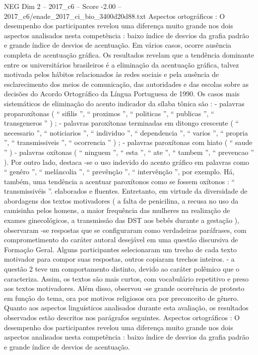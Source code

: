 \begin{textsample}{NEG Dim 2 – 2017\_c6 – Score -2.00 – 2017\_c6/enade\_2017\_ci\_bio\_3400d20d88.txt}
Aspectos ortográficos : O desempenho dos participantes revelou uma diferença muito grande nos dois aspectos analisados nesta competência : baixo índice de desvios da grafia padrão e grande índice de desvios de acentuação.
Em vários casos, ocorre ausência completa de acentuação gráfica.
Os resultados revelam que a tendência dominante entre os universitários brasileiros é a eliminação da acentuação gráfica, talvez motivada pelos hábitos relacionados às redes sociais e pela ausência de esclarecimento dos meios de comunicação, das autoridades e das escolas sobre as decisões do Acordo Ortográfico da Língua Portuguesa de 1990.
Os casos mais sistemáticos de eliminação do acento indicador da sílaba tônica são : - palavras proparoxítonas ( “ sifilis ”, “ proximos ”, “ politicas ”, “ publicas ”, “ transgeneros ” ) ; - palavras paroxítonas terminadas em ditongo crescente ( “ necessario ”, “ noticiarios ”, “ individuo ”, “ dependencia ”, “ varios ”, “ propria ”, “ transmissiveis ”, “ ocorrencia ” ) ; - palavras paroxítonas com hiato ( “ saude ” ) - palavras oxítonas ( “ ninguem ”, “ esta ”, “ ate ”, “ tambem ”, “ prevencao ” ).
Por outro lado, destaca -se o uso indevido do acento gráfico em palavras como “ genêro ”, “ melâncolia ”, “ prevênção ”, “ intervênção ”, por exemplo.
Há, também, uma tendência a acentuar paroxítonos como se fossem oxítonos : “ transmissivéis ”. elaborados e fluentes.
Entretanto, em virtude da diversidade de abordagens dos textos motivadores ( a falta de penicilina, a recusa no uso da camisinha pelos homens, a maior frequência das mulheres na realização de exames ginecológicos, a transmissão das DST aos bebês durante a gestação ), observaram -se respostas que se configuraram como verdadeiras paráfrases, com comprometimento do caráter autoral desejável em uma questão discursiva de Formação Geral.
Alguns participantes selecionaram um trecho de cada texto motivador para compor suas respostas, outros copiaram trechos inteiros. - a questão 2 teve um comportamento distinto, devido ao caráter polêmico que o caracteriza.
Assim, os textos são mais curtos, com vocabulário repetitivo e preso aos textos motivadores.
Além disso, observou -se grande ocorrência de protesto em função do tema, ora por motivos religiosos ora por preconceito de gênero.
Quanto aos aspectos linguísticos analisados durante esta avaliação, os resultados observados estão descritos nos parágrafos seguintes.
Aspectos ortográficos : O desempenho dos participantes revelou uma diferença muito grande nos dois aspectos analisados nesta competência : baixo índice de desvios da grafia padrão e grande índice de desvios de acentuação.

\end{textsample}
